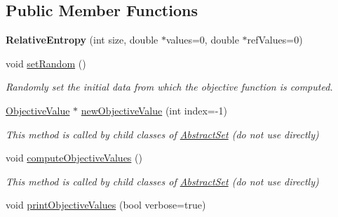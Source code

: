 \subsection*{Public Member Functions}
\begin{DoxyCompactItemize}
\item 
\hypertarget{classRelativeEntropy_a3681c506bf2071f11af6373ed2d2c570}{{\bfseries Relative\-Entropy} (int size, double $\ast$values=0, double $\ast$ref\-Values=0)}\label{classRelativeEntropy_a3681c506bf2071f11af6373ed2d2c570}

\item 
\hypertarget{classRelativeEntropy_aa34a724f03a10c7aa273cc6aa1444881}{void \hyperlink{classRelativeEntropy_aa34a724f03a10c7aa273cc6aa1444881}{set\-Random} ()}\label{classRelativeEntropy_aa34a724f03a10c7aa273cc6aa1444881}

\begin{DoxyCompactList}\small\item\em Randomly set the initial data from which the objective function is computed. \end{DoxyCompactList}\item 
\hypertarget{classRelativeEntropy_a88c993870571948119498a5004879730}{\hyperlink{classObjectiveValue}{Objective\-Value} $\ast$ \hyperlink{classRelativeEntropy_a88c993870571948119498a5004879730}{new\-Objective\-Value} (int index=-\/1)}\label{classRelativeEntropy_a88c993870571948119498a5004879730}

\begin{DoxyCompactList}\small\item\em This method is called by child classes of \hyperlink{classAbstractSet}{Abstract\-Set} (do not use directly) \end{DoxyCompactList}\item 
\hypertarget{classRelativeEntropy_ad2b1237540c333fc7bb7289579935598}{void \hyperlink{classRelativeEntropy_ad2b1237540c333fc7bb7289579935598}{compute\-Objective\-Values} ()}\label{classRelativeEntropy_ad2b1237540c333fc7bb7289579935598}

\begin{DoxyCompactList}\small\item\em This method is called by child classes of \hyperlink{classAbstractSet}{Abstract\-Set} (do not use directly) \end{DoxyCompactList}\item 
\hypertarget{classRelativeEntropy_affe7e822cc677fedfbc3ee259331763c}{void \hyperlink{classRelativeEntropy_affe7e822cc677fedfbc3ee259331763c}{print\-Objective\-Values} (bool verbose=true)}\label{classRelativeEntropy_affe7e822cc677fedfbc3ee259331763c}


\end{DoxyCompactItemize}
